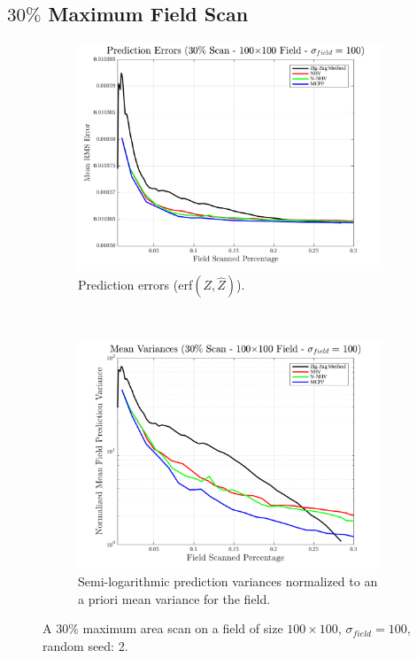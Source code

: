 \FloatBarrier
\clearpage
\subsection{$30\%$ Maximum Field Scan}
\begin{figure}[htb!]
    \centering
    \begin{subfigure}[t]{0.65\textwidth}
        \centering
        \includegraphics[width=\linewidth]{figures/hbresults/pred_errs_30p_100x100_sf_100_seed_2.png}
        \captionsetup{skip=0.20\baselineskip,size=footnotesize}
        \caption{Prediction errors (erf$(Z,\hat{Z})$).}
        \label{fig:prederrs_sigma100_p30_s2}
    \end{subfigure}%
    \\
    \begin{subfigure}[t]{0.65\textwidth}
        \centering
        \includegraphics[width=\linewidth]{figures/hbresults/vars_30p_100x100_sf_100_seed_2.png}
        \captionsetup{skip=0.20\baselineskip,size=footnotesize}
        \caption{Semi-logarithmic prediction variances normalized to an a priori mean variance for the field.}
        \label{fig:prederrs_sigma100_p30_s2}
    \end{subfigure}
    \captionsetup{skip=0.20\baselineskip}
    \caption{A $30\%$ maximum area scan on a field of size $100 \times 100$, $\sigma_{field} = 100$, random seed: 2.}
    \label{fig:sigma100_p30_s2}
\end{figure}

